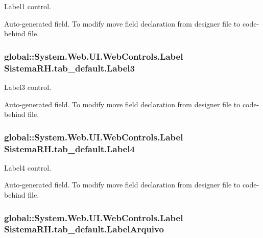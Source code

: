Label1 control. 

Auto-\/generated field. To modify move field declaration from designer file to code-\/behind file. \hypertarget{class_sistema_r_h_1_1tab__default_a66450fda5aa860689df3339b3c39ca3f}{
\subsubsection[{Label3}]{\setlength{\rightskip}{0pt plus 5cm}global::System.Web.UI.WebControls.Label {\bf SistemaRH.tab\_\-default.Label3}}}
\label{class_sistema_r_h_1_1tab__default_a66450fda5aa860689df3339b3c39ca3f}


Label3 control. 

Auto-\/generated field. To modify move field declaration from designer file to code-\/behind file. \hypertarget{class_sistema_r_h_1_1tab__default_af63d88312a2d87cff111d336edf7d127}{
\subsubsection[{Label4}]{\setlength{\rightskip}{0pt plus 5cm}global::System.Web.UI.WebControls.Label {\bf SistemaRH.tab\_\-default.Label4}}}
\label{class_sistema_r_h_1_1tab__default_af63d88312a2d87cff111d336edf7d127}


Label4 control. 

Auto-\/generated field. To modify move field declaration from designer file to code-\/behind file. \hypertarget{class_sistema_r_h_1_1tab__default_a13f80589969241dafbbeb6700eb7b4c3}{
\subsubsection[{LabelArquivo}]{\setlength{\rightskip}{0pt plus 5cm}global::System.Web.UI.WebControls.Label {\bf SistemaRH.tab\_\-default.LabelArquivo}}}
\label{class_sistema_r_h_1_1tab__default_a13f80589969241dafbbeb6700eb7b4c3}


